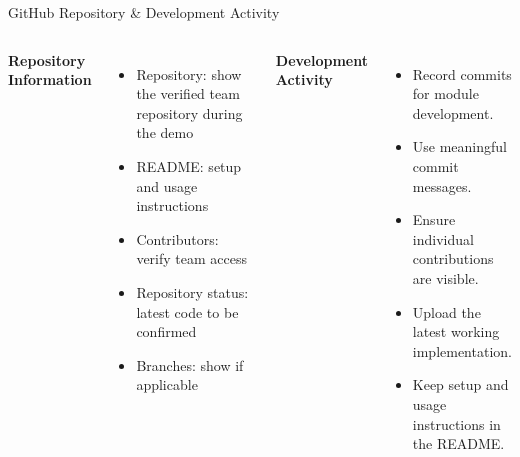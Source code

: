 \documentclass[aspectratio=169,10pt]{beamer}
\begin{document}
\begin{frame}{GitHub Repository \& Development Activity}
\begin{columns}[T,totalwidth=\textwidth]
\textbf{\color{GEUBlue}Repository Information}
\begin{itemize}\itemsep4pt
\item Repository: show the verified team repository during the demo
\item README: setup and usage instructions
\item Contributors: verify team access
\item Repository status: latest code to be confirmed
\item Branches: show if applicable
\end{itemize}
\textbf{\color{GEUBlue}Development Activity}
\begin{itemize}\itemsep4pt
\item Record commits for module development.
\item Use meaningful commit messages.
\item Ensure individual contributions are visible.
\item Upload the latest working implementation.
\item Keep setup and usage instructions in the README.
\end{itemize}
\end{columns}

\end{frame}
\end{document}
